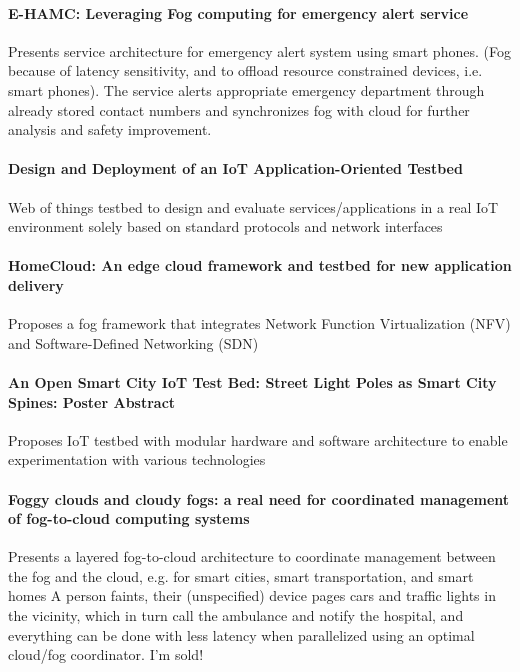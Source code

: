 \paragraph{E-HAMC: Leveraging Fog computing for emergency alert service} \cite{7134091}
Presents service architecture for emergency alert system using smart phones. (Fog because of latency sensitivity, and to offload resource constrained devices, i.e. smart phones). The service alerts appropriate emergency department through already stored contact numbers and synchronizes fog with cloud for further analysis and safety improvement.

\paragraph{Design and Deployment of an IoT Application-Oriented Testbed}\cite{belli_design_2015}
Web of things testbed to design and evaluate services/applications in a real IoT environment solely based on standard protocols and network interfaces

\paragraph{HomeCloud: An edge cloud framework and testbed for new application delivery} \cite{pan_homecloud:_2016}
Proposes a fog framework that integrates Network Function Virtualization (NFV) and Software-Defined Networking (SDN)

\paragraph{An Open Smart City IoT Test Bed: Street Light Poles as Smart City Spines: Poster Abstract}\cite{amrutur_open_2017}
Proposes IoT testbed with modular hardware and software architecture to enable experimentation with various technologies

\paragraph{Foggy clouds and cloudy fogs: a real need for coordinated management of fog-to-cloud computing systems}\cite{masip-bruin_foggy_2016}
Presents a layered fog-to-cloud architecture to coordinate management between the fog and the cloud, e.g. for smart cities, smart transportation, and smart homes
A person faints, their (unspecified) device pages cars and traffic lights in the vicinity,
which in turn call the ambulance and notify the hospital, and everything can be done with
less latency when parallelized using an optimal cloud/fog coordinator. I'm sold!

